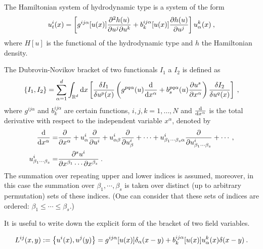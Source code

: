 \begin{definition} \label{def:hamiltonian-system}
    The Hamiltonian system of hydrodynamic type is a system of the form
        \begin{align}
            u^i_t (x) = 
            \left[ g^{ij \alpha} [u(x)] \frac{\partial^2 h(u)}{\partial u^j \partial u^k} + b_k^{ij \alpha} [u(x)] \frac{\partial h(u)}{\partial u^j} \right] u_\alpha^k(x) \:, \label{eq:Hamiltonian-system-of-h-t}
        \end{align}
        where $H[u]$ is the functional of the hydrodynamic type and $h$ the Hamiltonian density.
\end{definition}

\begin{definition}
    The Dubrovin-Novikov bracket of two functionals $I_1$ a $I_2$ is defined as
        \begin{align}
            \left \lbrace I_1,I_2 \right \rbrace = \sum_{\alpha = 1}^ d \int_{\mathbb{R}^d} \mathrm{d} x 
            \left[ \frac{\delta I_1}{\delta u^p(x)} \left( g^{pq \alpha}(u) \frac{\mathrm{d}}{\mathrm{d}x^\alpha} + b^{pq\alpha}_s(u) \frac{\partial u^s}{\partial x^\alpha} \right) \frac{\delta I_2}{\delta u^q(x)} \right] \:, \label{eq:Dubrovin-Novikov bracket}
        \end{align}
    where $g^{ij \alpha}$ and $b_k^{ij \alpha}$ are certain functions, $i,j,k = 1, \dots, N$ and $\frac{\mathrm{d}}{\mathrm{d}x^\alpha}$ is the total derivative with respect to the independent variable $x^\alpha$, denoted by
        \begin{align}
            \frac{\mathrm{d}}{\mathrm{d}x^\alpha} =& \frac{\partial }{\partial x^\alpha} + u^i_\alpha \frac{\partial }{\partial u^i} + u^i_{\alpha \beta} \frac{\partial }{\partial u^i_\beta} + \cdots + u^i_{\beta_1 \cdots \beta_s \alpha} \frac{\partial }{\partial u^i_{\beta_1 \cdots \beta_s}} + \cdots \:, \\
            u^i_{\beta_1 \cdots \beta_s} =& \frac{\partial ^s u^i}{\partial x^{\beta_1} \cdots \partial x^{\beta_s}} \:.
        \end{align}
    The summation over repeating upper and lower indices is assumed, moreover, in this case the summation over $\beta_1, \cdots, \beta_s$ is taken over distinct (up to arbitrary permutation) sets of these indices. (One can consider that these sets of indices are ordered: $\beta_1 \leq \cdots \leq \beta_s$.)
\end{definition}

It is useful to write down the explicit form of the bracket of two field variables.

\begin{proposition}
    \begin{align}
        L^{ij}(x,y) := \left \lbrace u^i(x), u^j(y) \right \rbrace = g^{ij \alpha} [u(x)] \delta_\alpha(x-y) + b_k^{ij \alpha} [u(x)] u_\alpha^k(x) \delta(x-y) \:.
    \end{align}
\end{proposition}

